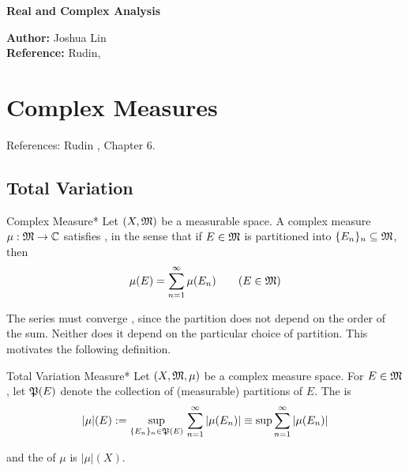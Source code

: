 




\begin{Large}
    \textsf{\textbf{Real and Complex Analysis}}
\end{Large}

\vspace{1ex}

\textsf{\textbf{Author:}} Joshua Lin \\
\textsf{\textbf{Reference:}} Rudin, 

\vspace{2ex}

\section{Complex Measures}

References: Rudin , Chapter 6. 
\stdvspace

\subsection{Total Variation}

\begin{definition}{Complex Measure}*
    Let \((X, \mathfrak{M})\) be a measurable space. A complex measure \(\mu : \mathfrak{M} \to \mathbb{C}\) satisfies , in the sense that if \(E \in \mathfrak{M}\) is partitioned into \(\{E_n\}_{n} \subseteq \mathfrak{M}\), then 
    \[
        \mu(E) = \sum_{n=1}^\infty \mu(E_n)
        \qquad (E \in \mathfrak{M})
    \]
\end{definition}

The series must converge , since the partition does not depend on the order of the sum. Neither does it depend on the particular choice of partition. This motivates the following definition. 

\begin{definition}{Total Variation Measure}*
    Let \((X, \mathfrak{M}, \mu)\) be a complex measure space. For \(E \in \mathfrak{M}\), let \(\mathfrak{P}(E)\) denote the collection of (measurable) partitions of \(E\). The  is
    \[
        |\mu|(E) := \sup_{\{E_n\}_n \in \mathfrak{P}(E)} \, \sum_{n=1}^\infty |\mu(E_n)|
        \equiv \sup \sum_{n=1}^\infty |\mu(E_n)|
    \]

    and the  of \(\mu\) is \(|\mu|(X)\). 
\end{definition}

